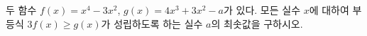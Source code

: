 두 함수 $f(x)=x^4-3x^2$, $g(x)=4x^3+3x^2-a$가 있다. 모든 실수 $x$에 대하여 부등식 $3f(x)\ge g(x)$가 성립하도록 하는 실수 $a$의 최솟값을 구하시오.
